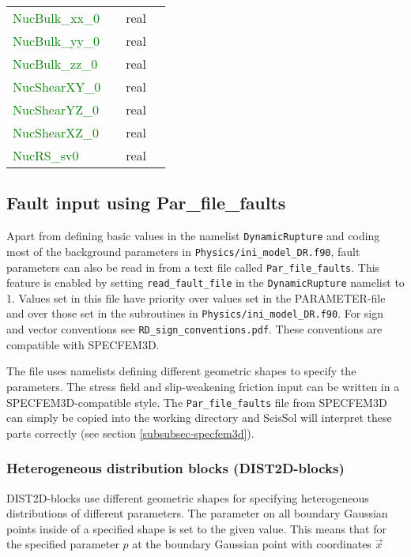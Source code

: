 \documentclass[12pt,twoside]{article}
\begin{document}
\begin{table}[H]
\begin{center}
\begin{tabular}{|p{4.8cm}|p{2.4cm}|p{2cm}|p{5cm}|}
\textcolor{green}{NucBulk\_xx\_0} & & real & \\
\textcolor{green}{NucBulk\_yy\_0} & & real & \\
\textcolor{green}{NucBulk\_zz\_0} & & real & \\
\textcolor{green}{NucShearXY\_0} & & real & \\
\textcolor{green}{NucShearYZ\_0} & & real & \\
\textcolor{green}{NucShearXZ\_0} & & real & \\
\textcolor{green}{NucRS\_sv0} & & real & \\
\hline
\end{tabular}
\end{center}
\label{nuc-table}
\end{table}

\subsection{Fault input using Par\_file\_faults} \label{subsec-faultinput}

Apart from defining basic values in the namelist \texttt{DynamicRupture} and coding most of the background parameters in \texttt{Physics/ini\_model\_DR.f90},
fault parameters can also be read in from a text file called \texttt{Par\_file\_faults}. This feature is enabled by setting \texttt{read\_fault\_file} in the \texttt{DynamicRupture} namelist to 1.
Values set in this file have priority over values set in the PARAMETER-file and over those set in the subroutines in \texttt{Physics/ini\_model\_DR.f90}.
For sign and vector conventions see \texttt{RD\_sign\_conventions.pdf}. These conventions are compatible with SPECFEM3D.

The file uses namelists defining different geometric shapes to specify the parameters. The stress field and slip-weakening friction input can be written in a SPECFEM3D-compatible style. The \texttt{Par\_file\_faults} file from SPECFEM3D can simply be copied into the working directory and SeisSol will interpret these parts correctly (see section \ref{subsubsec-specfem3d}).

\subsubsection{Heterogeneous distribution blocks (DIST2D-blocks)} \label{subsubsec-dist2d}

DIST2D-blocks use different geometric shapes for specifying heterogeneous distributions of different parameters. The parameter on all boundary Gaussian points inside of a specified shape is set to the given value. This means that for the specified parameter $p$ at the boundary Gaussian point with coordinates $\vec{x}$
\end{document}
